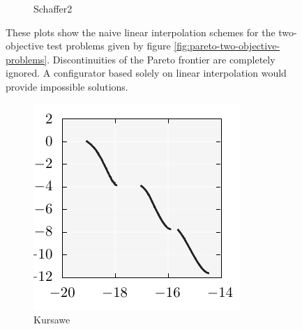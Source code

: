 \documentclass{stdlocal}
\begin{document}
\begin{figure}[t]
\begin{subfigure}[b]{0.24\textwidth}
        \caption{Schaffer2}
      \end{subfigure}
      \caption[]{%
        These plots show the naive linear interpolation schemes for the two-objective test problems given by figure \ref{fig:pareto-two-objective-problems}.
        Discontinuities of the Pareto frontier are completely ignored.
        A configurator based solely on linear interpolation would provide impossible solutions.
      }
      \label{fig:pareto-two-objective-problems-wrong}
    \end{figure}

    \begin{figure}[t]
      \center
      \begin{subfigure}[b]{0.24\textwidth}
        \center
        \includegraphics[width=\textwidth]{../../plots/kursawe_1000_tessellation.pdf}
        \caption{Kursawe}
      \end{subfigure}
      \begin{subfigure}[b]{0.24\textwidth}
        \center

\end{subfigure}
\end{figure}
\end{document}
